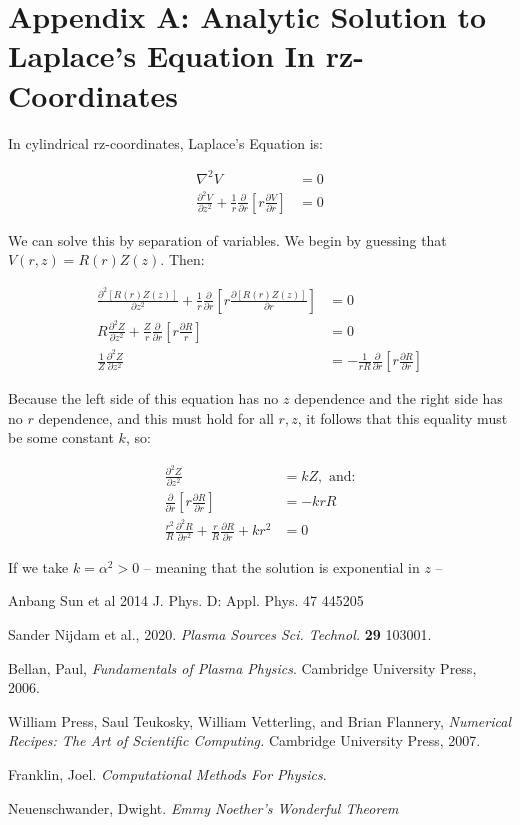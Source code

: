 \documentclass[11pt]{article}
\begin{document}
\section{Appendix A: Analytic Solution to Laplace's Equation In rz-Coordinates}
In cylindrical rz-coordinates, Laplace's Equation is:

\begin{align}
    \nabla^2V & = 0 \\
    \frac{\partial^2V}{\partial z^2} + \frac{1}{r} \frac{\partial}{\partial r}\left[ r \frac{\partial V}{\partial r}\right] & = 0
\end{align}

We can solve this by separation of variables. We begin by guessing that $V(r,z)=R(r)Z(z)$. Then:

\begin{align}
    \frac{\partial^2\left[R(r)Z(z)\right]}{\partial z^2} + \frac{1}{r} \frac{\partial}{\partial r}\left[ r \frac{\partial \left[R(r)Z(z)\right]}{\partial r}\right] & = 0 \\
    R\frac{\partial^2 Z}{\partial z^2} + \frac{Z}{r} \frac{\partial}{\partial r} \left[ r\frac{\partial R}{r}\right] & = 0 \\
    \frac{1}{Z} \frac{\partial^2Z}{\partial z^2} & = -\frac{1}{rR}\frac{\partial}{\partial r} \left[ r \frac{\partial R}{\partial r}\right]
\end{align}

Because the left side of this equation has no $z$ dependence and the right side has no $r$ dependence, and this must hold for all $r,z$, it follows that this equality must be some constant $k$, so:

\begin{align}
    \frac{\partial^2Z}{\partial z^2} &= kZ, \text{ and:}\\
    \frac{\partial}{\partial r}\left[ r\frac{\partial R}{\partial r }\right] &= -krR \\
    \frac{r^2}{R} \frac{\partial^2R}{\partial r^2} + \frac{r}{R} \frac{\partial R}{\partial r} + kr^2 & = 0
\end{align}

If we take $k = \alpha^2 > 0$ – meaning that the solution is exponential in $z$ – 



\begin{thebibliography}{9}
Anbang Sun et al 2014 J. Phys. D: Appl. Phys. 47 445205

Sander Nijdam et al., 2020. \textit{Plasma Sources Sci. Technol.} \textbf{29} 103001.

Bellan, Paul, \textit{Fundamentals of Plasma Physics}. Cambridge University Press, 2006. 

William Press, Saul Teukosky, William Vetterling, and Brian Flannery, \textit{Numerical Recipes: The Art of Scientific Computing.} Cambridge University Press, 2007.


Franklin, Joel. \textit{Computational Methods For Physics}.

Neuenschwander, Dwight. \textit{Emmy Noether's Wonderful Theorem}
\end{thebibliography}
\end{document}
